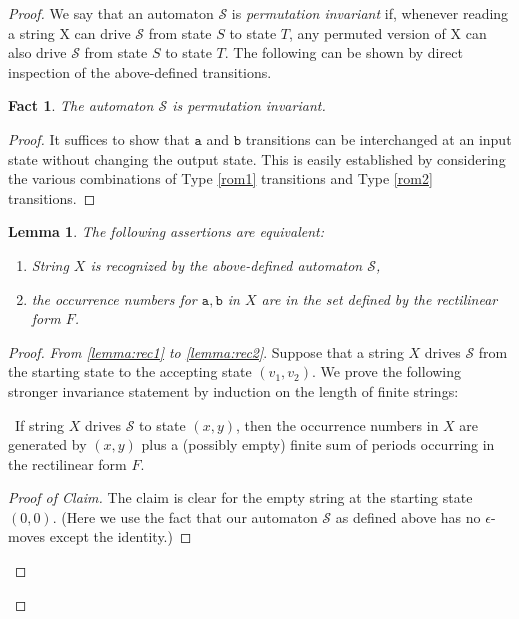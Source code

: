 \documentclass[12pt,oneside,reqno]{amsart}
\newtheorem{fact}{Fact}
\newtheorem{lemma}{Lemma}
\theoremstyle{definition}
\begin{document}
\begin{proof}
We say that an automaton $\mathcal{S}$ is \emph{permutation invariant} if, whenever reading a string 
	X can drive $\mathcal{S}$ from state $S$ to state $T$,  any permuted version of X can also 
	drive $\mathcal{S}$ from state $S$ to state $T$.
The following can be shown by direct inspection of  the above-defined transitions.

\begin{fact} 	The automaton $\mathcal{S}$ is permutation invariant. \end{fact}

\begin{proof} It suffices to show that $\mathtt{a}$ and $\mathtt{b}$ transitions can be interchanged at an input state without changing the output state. This is easily established by considering the various combinations of Type \ref{rom1} transitions and Type \ref{rom2} transitions.
\end{proof}
\begin{lemma} The following assertions are equivalent: \begin{enumerate}[label=(\roman*)]
    \item \label{lemma:rec1} String $X$ is recognized by the above-defined automaton $\mathcal{S}$,
    \item \label{lemma:rec2} the occurrence numbers 
	for $\mathtt{a}, \mathtt{b}$ in $X$ are in the set defined by the rectilinear form $F$.
\end{enumerate}\end{lemma}

\begin{proof}   	\emph{From \ref{lemma:rec1} to \ref{lemma:rec2}}. Suppose that a string $X$ drives $\mathcal{S}$ from the starting state to the accepting state $(v_1, v_2)$.  We prove the following stronger invariance statement by induction on the length of finite strings:

\vspace{1.5ex}

	\, If string $X$ drives $\mathcal{S}$ to state $(x, y)$, then the occurrence numbers in $X$  are generated by $(x, y)$ plus a (possibly empty) finite sum of periods occurring  in the  rectilinear form $F$.

\begin{proof}[Proof of Claim] The claim is clear for the empty string at the starting state $(0, 0)$. (Here we use the fact that our automaton $\mathcal{S}$ as defined above has no $\epsilon$-moves except the identity.)


\end{proof}
\end{proof}
\end{proof}
\end{document}
